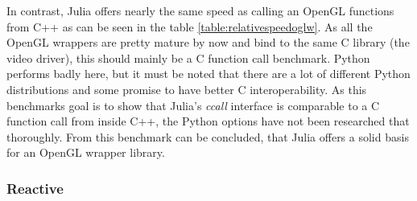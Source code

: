 In contrast, Julia offers nearly the same speed as calling an OpenGL functions from C++ as can be seen in the table \ref{table:relativespeedoglw}.
As all the OpenGL wrappers are pretty mature by now and bind to the same C library (the video driver), this should mainly be a C function call benchmark.
Python performs badly here, but it must be noted that there are a lot of different Python distributions and some promise to have better C interoperability.
As this benchmarks goal is to show that Julia’s \textit{ccall} interface is comparable to a C function call from inside C++, the Python options have not been researched that thoroughly.
From this benchmark can be concluded, that Julia offers a solid basis for an OpenGL wrapper library.

\subsubsection{Reactive}

